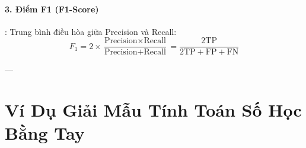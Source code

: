\paragraph{3. Điểm F1 (F1-Score)}:
Trung bình điều hòa giữa Precision và Recall:
\begin{equation}
F_1 = 2 \times \frac{\text{Precision} \times \text{Recall}}{\text{Precision} + \text{Recall}} = \frac{2\text{TP}}{2\text{TP} + \text{FP} + \text{FN}}
\label{eq:f1-score-def}
\end{equation}

---

\section{Ví Dụ Giải Mẫu Tính Toán Số Học Bằng Tay}
\label{sec:ch05-numerical-walkthrough}

